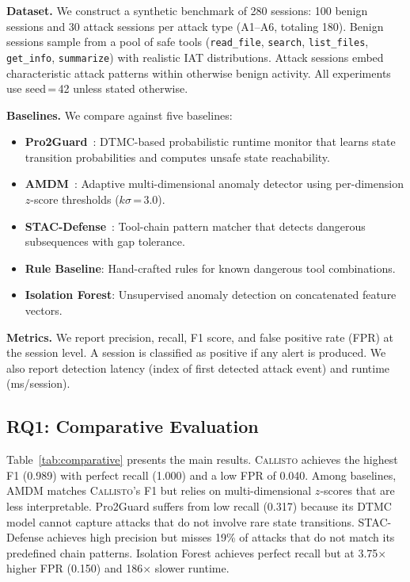 \documentclass[conference,compsoc]{IEEEtran}
\newcommand{\system}{\textsc{Callisto}}
\begin{document}
\textbf{Dataset.} We construct a synthetic benchmark of 280 sessions: 100 benign sessions and 30 attack sessions per attack type (A1--A6, totaling 180). Benign sessions sample from a pool of safe tools (\texttt{read\_file}, \texttt{search}, \texttt{list\_files}, \texttt{get\_info}, \texttt{summarize}) with realistic IAT distributions. Attack sessions embed characteristic attack patterns within otherwise benign activity. All experiments use seed\,=\,42 unless stated otherwise.

\textbf{Baselines.} We compare against five baselines:
\begin{itemize}[leftmargin=*,nosep]
\item \textbf{Pro2Guard}~\cite{pro2guard2025}: DTMC-based probabilistic runtime monitor that learns state transition probabilities and computes unsafe state reachability.
\item \textbf{AMDM}~\cite{amdm2025}: Adaptive multi-dimensional anomaly detector using per-dimension $z$-score thresholds ($k\sigma$\,=\,3.0).
\item \textbf{STAC-Defense}~\cite{stac2025}: Tool-chain pattern matcher that detects dangerous subsequences with gap tolerance.
\item \textbf{Rule Baseline}: Hand-crafted rules for known dangerous tool combinations.
\item \textbf{Isolation Forest}: Unsupervised anomaly detection on concatenated feature vectors.
\end{itemize}

\textbf{Metrics.} We report precision, recall, F1 score, and false positive rate (FPR) at the session level. A session is classified as positive if any alert is produced. We also report detection latency (index of first detected attack event) and runtime (ms/session).

\subsection{RQ1: Comparative Evaluation}
\label{sec:comparative}

Table~\ref{tab:comparative} presents the main results. \system{} achieves the highest F1 (0.989) with perfect recall (1.000) and a low FPR of 0.040. Among baselines, AMDM matches \system{}'s F1 but relies on multi-dimensional $z$-scores that are less interpretable. Pro2Guard suffers from low recall (0.317) because its DTMC model cannot capture attacks that do not involve rare state transitions. STAC-Defense achieves high precision but misses 19\% of attacks that do not match its predefined chain patterns. Isolation Forest achieves perfect recall but at 3.75$\times$ higher FPR (0.150) and 186$\times$ slower runtime.
\end{document}

